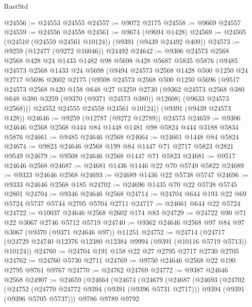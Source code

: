 \begin{lexlean}{RustStd}
\begin{coremodule}
@24556 := @24553 @24555
@24557 := @9072 @2175
@24558 := @9669 @24557
@24559 := @24556 @24558
@24561 := @9674 (@9694 @1428)
@24569 := @24505 (@24510 (@24559 @24561 @10124)) (@9391 (@9439 @24492 @409))
@24573 := @9259 (@12477 (@9272 @16046)) @24492
@24642 := @9306
    @24573
    @2568
    @2568
    @428
    @24
    @1433
    @1482
    @98
    @5698
    @428
    @5687
    @5835
    @5876
    (@9485
      @24573
      @2568
      @1433
      @24
      @5698
      (@9494
        @24573
        @2568
        @1428
        @500
        @1250
        @24
        @2717
        @5696
        @2602
        @2175
        (@9508
          @24573
          @2568
          @500
          @1250
          @5696
          (@9517
            @24573
            @2568
            @420
            @158
            @648
            @27
            @3259
            @2730
            (@9362 @24573 @2568 @380 @648 @380 @3259 (@9370 (@9371 @24573 @380)) @12608)
            (@9633 @24573 @2568)))
        @24552
        @24555
        @24558
        @24561
        @10124))
    (@9391 (@9439 @24573 @428))
@24646 := @9259 (@12787 (@9272 @12789)) @24573
@24659 := @9306 @24646 @2568 @2568 @444 @84 @1448 @1481 @98 @5824 @444 @3188 @5834 @5876
@24661 := @9485 @24646 @2568
@24664 := @24661 @1448 @84 @5824
@24674 := @9823 @24646 @2568 @199 @84 @1447 @71 @2717 @5823 @2821 @9549
@24679 := @9508 @24646 @2568 @1447 @71 @5823
@24681 := @9517 @24646 @2568
@24687 := @24681 @1436 @1446 @22 @70 @5749 @5822
@24689 := @9323 @24646 @2568
@24693 := @24689 @1436 @22 @5738 @5747
@24696 := @9333 @24646 @2568 @185
@24702 := @24696 @1435 @70 @22 @5738 @5745 @2801
@24704 := @9346 @24646 @2568
@24714 := @24704 @644 @193 @22 @69 @5724 @5737 @5744 @2705 @5704 @2711
@24717 := @24661 @644 @22 @5724
@24722 := @10037 @24646 @2568 @2602 @174 @83
@24729 := @24722 @90 @71 @22 @3067 @2746 @5712 @5719
@24740 := @9362 @24646 @2568 @97 @84 @97 @3067 (@9370 (@9371 @24646 @97)) @11251
@24752 := @24714
    (@24717 (@24729 @24740 @12376 @12380 @12384 @9994 (@9391 (@10116 @5719 @5713)) @10124))
@24760 := @24704 @191 @158 @22 @27 @2795 @2717 @2730 @2705
@24762 := @24760 @5730 @2711
@24769 := @9750 @24646 @2568 @22 @190 @2795 @9761 @9767
@24770 := @24762 @24769
@24772 := @9387 @24646 @2568
@24907 := @24659
    (@24664
      (@24674
        (@24679
          (@24687
            (@24693
              (@24702
                (@24752
                  (@24770 @24772 @9394 (@9391 (@9396 @5731 @2717)))
                  @9394
                  (@9391 (@9396 @5705 @5737)))
                @9786
                @9789
                @9792

\end{coremodule}
\end{lexlean}
